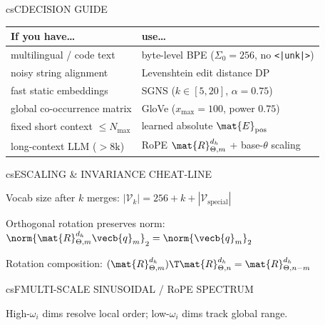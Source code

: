 \documentclass[../../../../master.tex]{subfiles}
\begin{document}
\begin{cscolumns}
\begin{cscard}{csC}{DECISION GUIDE}
  \renewcommand{\arraystretch}{1.22}\small
  \begin{tabular}{@{}>{\raggedright\arraybackslash}p{3.1cm}>{\raggedright\arraybackslash}p{4.6cm}@{}}
    \textbf{If you have\ldots} & \textbf{use\ldots}\\ \hline
    multilingual / code text & byte-level BPE ($\Sigma_0=256$, no \texttt{<|unk|>})\\
    noisy string alignment & Levenshtein edit distance DP\\
    fast static embeddings & SGNS ($k\in[5,20]$, $\alpha=0.75$)\\
    global co-occurrence matrix & GloVe ($x_{\max}=100$, power $0.75$)\\
    fixed short context $\le N_{\max}$ & learned absolute $\mat{E}_{\mathrm{pos}}$\\
    long-context LLM ($>8\text{k}$) & RoPE $\mat{R}_{\Theta,m}^{d_h}$ + base-$\theta$ scaling\\
  \end{tabular}
\end{cscard}

\begin{cscard}{csE}{SCALING \& INVARIANCE CHEAT-LINE}
  \begin{csbul}
    \item Vocab size after $k$ merges: $|\mathcal{V}_k| = 256 + k + |\mathcal{V}_{\mathrm{special}}|$
    \item Orthogonal rotation preserves norm: $\norm{\mat{R}_{\Theta,m}^{d_h}\vecb{q}_m}_2 = \norm{\vecb{q}_m}_2$
    \item Rotation composition: $(\mat{R}_{\Theta,m}^{d_h})\T\mat{R}_{\Theta,n}^{d_h} = \mat{R}_{\Theta,n-m}^{d_h}$
  \end{csbul}
\end{cscard}

\begin{cscard}{csF}{MULTI-SCALE SINUSOIDAL / RoPE SPECTRUM}
  \centering
  \par
  {\scriptsize High-$\omega_i$ dims resolve local order; low-$\omega_i$ dims track global range.}
\end{cscard}
\columnbreak


\end{cscolumns}
\end{document}
